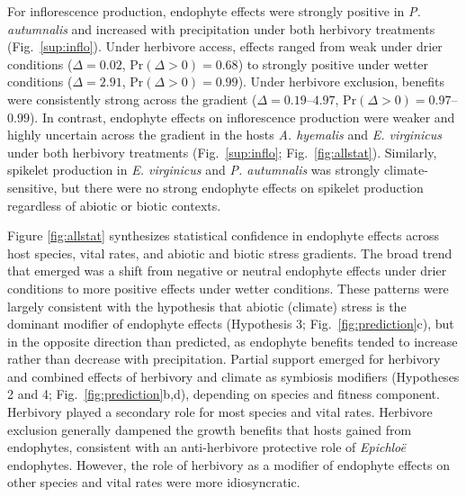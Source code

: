 \documentclass[12pt]{article}\usepackage[]{graphicx}\usepackage[dvipsnames]{xcolor}
\begin{document}
For inflorescence production, endophyte effects were strongly positive in \textit{P. autumnalis} and increased with precipitation under both herbivory treatments (Fig.~\ref{sup:inflo}). 
Under herbivore access, effects ranged from weak under drier conditions ($\Delta = 0.02$, $\mathrm{Pr}(\Delta > 0) = 0.68$) to strongly positive under wetter conditions ($\Delta = 2.91$, $\mathrm{Pr}(\Delta > 0) = 0.99$). 
Under herbivore exclusion, benefits were consistently strong across the gradient ($\Delta = 0.19$--$4.97$, $\mathrm{Pr}(\Delta > 0) = 0.97$--$0.99$). 
In contrast, endophyte effects on inflorescence production were weaker and highly uncertain across the gradient in the hosts \textit{A. hyemalis} and \textit{E. virginicus} under both herbivory treatments (Fig.~\ref{sup:inflo}; Fig.~\ref{fig:allstat}). 
Similarly, spikelet production in \textit{E. virginicus} and \textit{P. autumnalis} was strongly climate-sensitive, but there were no strong endophyte effects on spikelet production regardless of abiotic or biotic contexts. 


Figure \ref{fig:allstat} synthesizes statistical confidence in endophyte effects across host species, vital rates, and abiotic and biotic stress gradients. 
The broad trend that emerged was a shift from negative or neutral endophyte effects under drier conditions to more positive effects under wetter conditions.
These patterns were largely consistent with the hypothesis that abiotic (climate) stress is the dominant modifier of endophyte effects (Hypothesis 3; Fig.~\ref{fig:prediction}c), but in the opposite direction than predicted, as endophyte benefits tended to increase rather than decrease with precipitation. 
Partial support emerged for herbivory and combined effects of herbivory and climate as symbiosis modifiers (Hypotheses 2 and 4; Fig.~\ref{fig:prediction}b,d), depending on species and fitness component. 
Herbivory played a secondary role for most species and vital rates. 
Herbivore exclusion generally dampened the growth benefits that hosts gained from endophytes, consistent with an anti-herbivore protective role of \textit{Epichloë} endophytes. 
However, the role of herbivory as a modifier of endophyte effects on  other species and vital rates were more idiosyncratic. 
\end{document}
